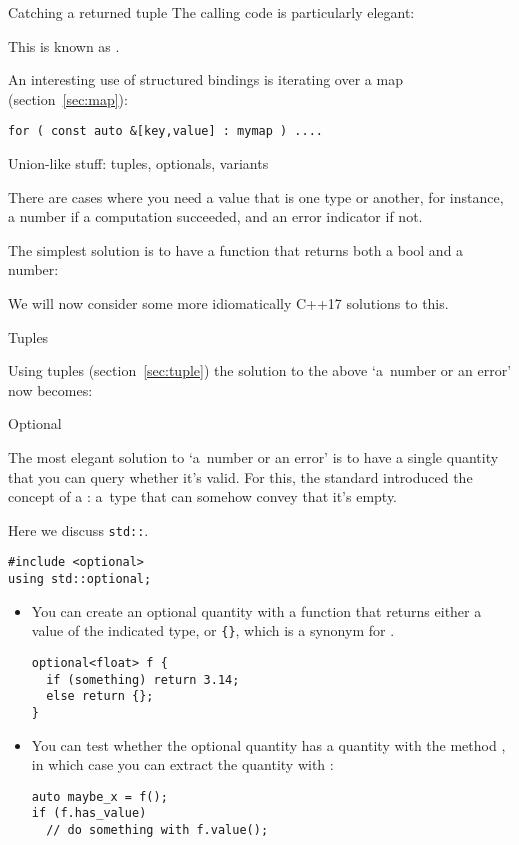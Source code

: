 \begin{block}{Catching a returned tuple}
  \label{sl:catch-tuple}
  The calling code is particularly elegant:

  This is known as .
\end{block}

An interesting use of structured bindings is iterating over a map (section~\ref{sec:map}):
\begin{lstlisting}
for ( const auto &[key,value] : mymap ) ....
\end{lstlisting}

 {Union-like stuff: tuples, optionals, variants}

There are cases where you need a value that is one type or another,
for instance, a number if a computation succeeded, and an error
indicator if not.

The simplest solution is to have a function that returns both a bool
and a number:
%

We will now consider some more idiomatically C++17 solutions to this.

 {Tuples}

Using tuples (section~\ref{sec:tuple}) 
the solution to the above `a~number or an error' now becomes:
%

 {Optional}
\label{sec:std-optional}

The most elegant solution to `a~number or an error' is to have a
single quantity that you can query whether it's valid.
For this, the
 standard
introduced the concept of a :
a~type that can somehow convey that it's empty.

Here we discuss \lstinline{std::}.

\begin{lstlisting}
#include <optional>
using std::optional;
\end{lstlisting}

\begin{itemize}
\item You can create an optional quantity with a function that returns
  either a value of the indicated type, or \verb+{}+, which is a
  synonym for .
\begin{lstlisting}
optional<float> f {
  if (something) return 3.14;
  else return {};
}
\end{lstlisting}
\item You can test whether the optional quantity has a quantity with
  the method , in which case you can extract the quantity
  with :
\begin{lstlisting}
auto maybe_x = f();
if (f.has_value)
  // do something with f.value();
\end{lstlisting}
\end{itemize}

